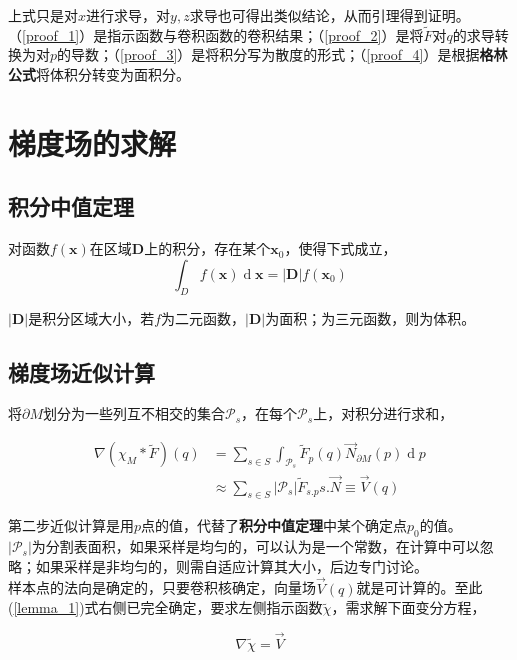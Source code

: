 上式只是对$x$进行求导，对$y,z$求导也可得出类似结论，从而引理得到证明。\\

（\ref{proof_1}）是指示函数与卷积函数的卷积结果；（\ref{proof_2}）是将$\tilde{F}$对$q$的求导转换为对$p$的导数；（\ref{proof_3}）是将积分写为散度的形式；（\ref{proof_4}）是根据\textbf{格林公式}将体积分转变为面积分。

\section{梯度场的求解}

\subsection*{积分中值定理}
	对函数$f(\mathbf{x})$在区域$\mathbf{D}$上的积分，存在某个$\mathbf{x}_0$，使得下式成立，
	$$
		\int_D f(\mathbf{x}) \mathop{d}\mathbf{x} = |\mathbf{D}|f(\mathbf{x}_0)
	$$

	$|\mathbf{D}|$是积分区域大小，若$f$为二元函数，$|\mathbf{D}|$为面积；为三元函数，则为体积。

\subsection*{梯度场近似计算}
将$\partial M$划分为一些列互不相交的集合$\mathcal{P}_s$，在每个$\mathcal{P}_s$上，对积分进行求和，

\begin{align}
	\nabla (\chi_M * \tilde{F})(q) &= \sum_{s \in S}\int_{\mathcal{P}_s}\tilde{F}_p(q)\overrightarrow{N}_{\partial M}(p)\mathop{d}p\\
	&\approx \sum_{s \in S}|\mathcal{P}_s|\tilde{F}_{s.p}s.\overrightarrow{N} \equiv \overrightarrow{V}(q) \label{vector_field}
\end{align}

第二步近似计算是用$p$点的值，代替了\textbf{积分中值定理}中某个确定点$p_0$的值。\\

$|\mathcal{P}_s|$为分割表面积，如果采样是均匀的，可以认为是一个常数，在计算中可以忽略；如果采样是非均匀的，则需自适应计算其大小，后边专门讨论。\\

样本点的法向是确定的，只要卷积核确定，向量场$\overrightarrow{V}(q)$就是可计算的。至此(\ref{lemma_1})式右侧已完全确定，要求左侧指示函数$\tilde{\chi}$，需求解下面变分方程，

$$
\nabla \tilde{\chi} = \overrightarrow{V}
$$

